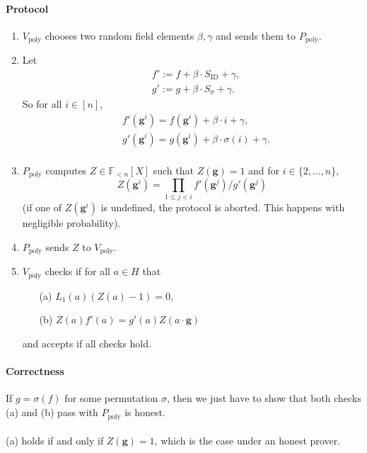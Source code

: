 \documentclass[11pt]{article}
\newcommand{\field}{\mathbb{F}}
\newcommand{\gen}{\mathbf{g}}
\begin{document}
\paragraph{Protocol}
\begin{enumerate}
    \item $V_{\text{poly}}$ chooses two random field elements $\beta, \gamma$ and sends them to $P_\text{poly}$.
    
    \item Let
    \begin{align*}
        &f' := f + \beta \cdot S_\text{ID} + \gamma, \\
        &g' := g + \beta \cdot S_\sigma + \gamma.
    \end{align*}
    So for all $i \in [n]$,
    \begin{align*}
        &f'(\gen^i) = f(\gen^i) + \beta \cdot i + \gamma, \\
        &g'(\gen^i) = g(\gen^i) + \beta \cdot \sigma(i) + \gamma. \\
    \end{align*}

    \item $P_\text{poly}$ computes $Z \in \field_{<n}[X]$ such that $Z(\gen{}) = 1$ and for $i \in \{2, \ldots, n\}$,
    \[ Z(\gen^i) = \prod_{1 \leq j < i} f'(\gen^j) / g'(\gen^j) \]
    (if one of $Z(\gen^i)$ is undefined, the protocol is aborted. This happens with negligible probability).

    \item $P_\text{poly}$ sends $Z$ to $V_\text{poly}$.
    \item $V_\text{poly}$ checks if for all $a \in H$ that
    \begin{itemize}
        \item[(a)] $L_1(a)(Z(a) - 1) = 0$,
        \item[(b)] $Z(a)f'(a) = g'(a)Z(a \cdot \gen{})$
    \end{itemize}
    and accepts if all checks hold.
\end{enumerate}

\paragraph{Correctness} If $g = \sigma(f)$ for some permutation $\sigma$, then we just have to show that both checks (a) and (b) pass with $P_\text{poly}$ is honest. 

\paragraph{} (a) holds if and only if $Z(\gen) = 1$, which is the case under an honest prover. 
\end{document}
